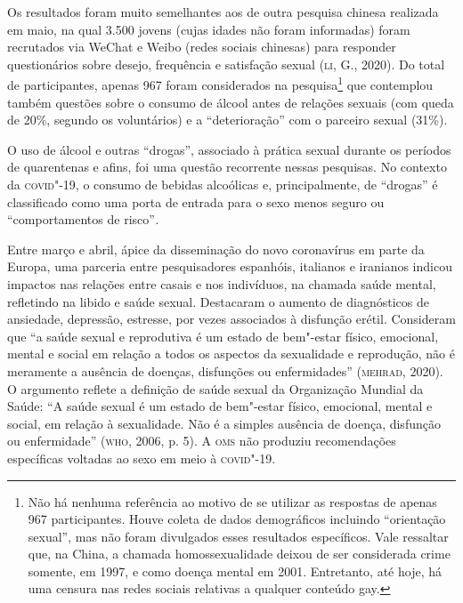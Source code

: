Os resultados foram muito semelhantes aos de outra pesquisa chinesa
realizada em maio, na qual 3.500 jovens (cujas idades não foram
informadas) foram recrutados via WeChat e Weibo (redes sociais chinesas)
para responder questionários sobre desejo, frequência e satisfação
sexual (\textsc{li}, G., 2020). Do total de participantes, apenas 967 foram
considerados na pesquisa\footnote{Não há nenhuma referência ao motivo de
  se utilizar as respostas de apenas 967 participantes. Houve coleta de
  dados demográficos incluindo ``orientação sexual'', mas não foram
  divulgados esses resultados específicos. Vale ressaltar que, na China,
  a chamada homossexualidade deixou de ser considerada crime somente, em
  1997, e como doença mental em 2001. Entretanto, até hoje, há uma
  censura nas redes sociais relativas a qualquer conteúdo gay.} que
contemplou também questões sobre o consumo de álcool antes de relações
sexuais (com queda de 20\%, segundo os voluntários) e a ``deterioração''
com o parceiro sexual (31\%).

O uso de álcool e outras ``drogas'', associado à prática sexual durante
os períodos de quarentenas e afins, foi uma questão recorrente nessas
pesquisas. No contexto da \textsc{covid}"-19, o consumo de bebidas alcoólicas e,
principalmente, de ``drogas'' é classificado como uma porta de entrada
para o sexo menos seguro ou ``comportamentos de risco''\emph{. }

Entre março e abril, ápice da disseminação do novo coronavírus em parte
da Europa, uma parceria entre pesquisadores espanhóis, italianos e
iranianos indicou impactos nas relações entre casais e nos indivíduos,
na chamada saúde mental, refletindo na libido e saúde sexual. Destacaram
o aumento de diagnósticos de ansiedade, depressão, estresse, por vezes
associados à disfunção erétil. Consideram que ``a saúde sexual e
reprodutiva é um estado de bem"-estar físico, emocional, mental e social
em relação a todos os aspectos da sexualidade e reprodução, não é
meramente a ausência de doenças, disfunções ou enfermidades'' (\textsc{mehrad},
2020). O argumento reflete a definição de saúde sexual da Organização
Mundial da Saúde: ``A saúde sexual é um estado de bem"-estar físico,
emocional, mental e social, em relação à sexualidade. Não é a simples
ausência de doença, disfunção ou enfermidade'' (\textsc{who}, 2006, p. 5). A \textsc{oms}
não produziu recomendações específicas voltadas ao sexo em meio à
\textsc{covid}"-19.

